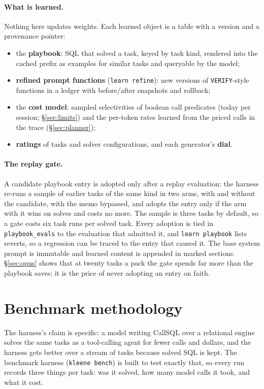 \documentclass[11pt,a4paper]{article}
\newcommand{\callsql}{CallSQL}
\newcommand{\code}[1]{\texttt{#1}}
\begin{document}
\paragraph{What is learned.} Nothing here updates weights. Each learned object
is a table with a version and a provenance pointer:

\begin{itemize}[leftmargin=1.5em,itemsep=1pt]
\item the \textbf{playbook}: SQL that solved a task, keyed by task kind,
  rendered into the cached prefix as examples for similar tasks and queryable
  by the model;
\item \textbf{refined prompt functions} (\code{learn refine}): new versions of
  \code{VERIFY}-style functions in a ledger with before/after snapshots and
  rollback;
\item the \textbf{cost model}: sampled selectivities of boolean call predicates
  (today per session; \S\ref{sec:limits}) and the per-token rates learned
  from the priced calls in the trace (\S\ref{sec:planner});
\item \textbf{ratings} of tasks and solver configurations, and each generator's
  \textbf{dial}.
\end{itemize}

\paragraph{The replay gate.} A candidate playbook entry is adopted only after a
replay evaluation: the harness re-runs a sample of earlier tasks of the same
kind in two arms, with and without the candidate, with the memo bypassed, and
adopts the entry only if the arm with it wins on solves and costs no more. The
sample is three tasks by default, so a gate costs six task runs per solved
task. Every adoption is tied in \code{playbook\_evals} to the evaluation that
admitted it, and \code{learn playbook} lists reverts, so a regression can be
traced to the entry that caused it. The base system prompt is immutable and
learned content is appended in marked sections. \S\ref{sec:opus} shows that at
twenty tasks a pack the gate spends far more than the playbook saves; it is the
price of never adopting an entry on faith.

\section{Benchmark methodology}
\label{sec:bench}

The harness's claim is specific: a model writing \callsql{} over a relational
engine solves the same tasks as a tool-calling agent for fewer calls and
dollars, and the harness gets better over a stream of tasks because solved SQL
is kept. The benchmark harness (\code{kleene bench}) is built to test exactly
that, so every run records three things per task: was it solved, how many model
calls it took, and what it cost.
\end{document}
